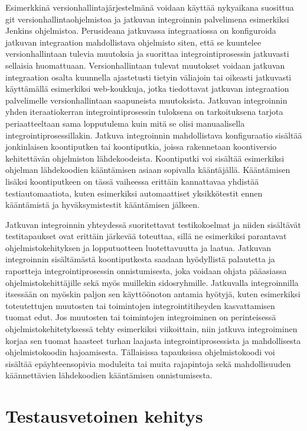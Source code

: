  Esimerkkinä versionhallintajärjestelmänä voidaan käyttää nykyaikana suosittua git versionhallintaohjelmistoa ja jatkuvan integroinnin palvelimena esimerkiksi Jenkins ohjelmistoa.
  Perusideana jatkuvassa integraatiossa on konfiguroida jatkuvan integraation mahdollistava ohjelmisto siten, että se kuuntelee versionhallintaan tulevia muutoksia ja suorittaa integrointiprosessin jatkuvasti sellaisia huomattuaan.
  Versionhallintaan tulevat muutokset voidaan jatkuvan integraation osalta kuunnella ajastetusti tietyin väliajoin tai oikeasti jatkuvasti käyttämällä esimerkiksi web-koukkuja, jotka tiedottavat jatkuvan integraation palvelimelle versionhallintaan saapuneista muutoksista.
  Jatkuvan integroinnin yhden iteraatiokerran integrointiprosessin tuloksena on tarkoituksena tarjota periaatteeltaan sama lopputulema kuin mitä se olisi manuaalisella integrointiprosessillakin.
  Jatkuva integroinnin mahdollistava konfiguraatio sisältää jonkinlaisen koontiputken tai koontiputkia, joissa rakennetaan koontiversio kehitettävän ohjelmiston lähdekoodeista.
  Koontiputki voi sisältää esimerkiksi ohjelman lähdekoodien kääntämisen asiaan sopivalla kääntäjällä.
  Kääntämisen lisäksi koontiputkeen on tässä vaiheessa erittäin kannattavaa yhdistää testiautomaatiota, kuten esimerkiksi automaattiset yksikkötestit ennen kääntämistä ja hyväksymistestit kääntämisen jälkeen.

  Jatkuvan integroinnin yhteydessä suoritettavat testikokoelmat ja niiden sisältävät testitapaukset ovat erittäin järkevää toteuttaa, sillä ne esimerkiksi parantavat ohjelmistokehityksen ja lopputuotteen luotettavuutta ja laatua.
  Jatkuvan integroinnin sisältämästä koontiputkesta saadaan hyödyllistä palautetta ja raportteja integrointiprosessin onnistumisesta, joka voidaan ohjata pääasiassa ohjelmistokehittäjille sekä myös muillekin sidosryhmille.
  Jatkuvalla integroinnilla itsessään on myöskin paljon sen käyttöönoton antamia hyötyjä, kuten esimerkiksi toteutettujen muutosten tai toimintojen integrointitiheyden kasvattamisen tuomat edut.
  Jos muutosten tai toimintojen integroiminen on perinteisessä ohjelmistokehitetyksessä tehty esimerkiksi viikoittain, niin jatkuva integroiminen korjaa sen tuomat haasteet turhan laajasta integrointiprosessista ja mahdollisesta ohjelmistokoodin hajoamisesta.
  Tällaisissa tapauksissa ohjelmistokoodi voi sisältää epäyhteensopivia moduleita tai muita rajapintoja sekä mahdollisuuden käännettävien lähdekoodien kääntämisen onnistumisesta.

\section{Testausvetoinen kehitys} \label{ch:07_testausvetoinen_kehitys}


